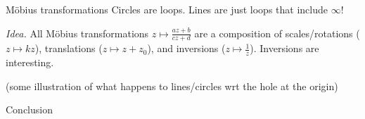 \documentclass{beamer}
\begin{document}
\begin{frame}[t]{M\"{o}bius transformations} \vspace{4pt}
Circles are loops. Lines are just loops that include \(\infty\)!

\textit{Idea.} All M\"{o}bius transformations \(z \mapsto \frac{az + b}{cz + d}\) are a composition of scales/rotations (\(z \mapsto kz\)), translations (\(z \mapsto z + z_0\)), and inversions (\(z \mapsto \frac{1}{z}\)). Inversions are interesting.

(some illustration of what happens to lines/circles wrt the hole at the origin)
\end{frame}

\begin{frame}[standout]
\flushleft
Conclusion
\end{frame}
\end{document}
